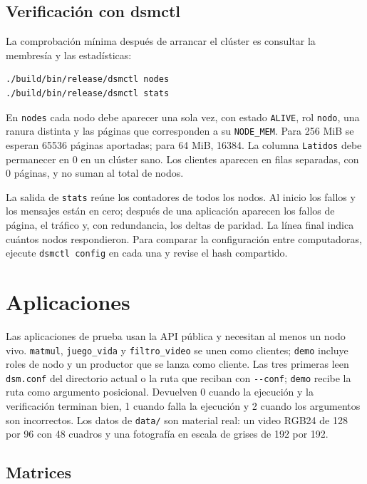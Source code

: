 \subsection{Verificación con dsmctl}\label{subsec:verificacion-dsmctl}

La comprobación mínima después de arrancar el clúster es consultar la membresía y las estadísticas:

\begin{lstlisting}
./build/bin/release/dsmctl nodes
./build/bin/release/dsmctl stats
\end{lstlisting}

En \texttt{nodes} cada nodo debe aparecer una sola vez, con estado \texttt{ALIVE}, rol \texttt{nodo}, una ranura distinta y las páginas que corresponden a su \texttt{NODE\_MEM}. Para 256 MiB se esperan 65536 páginas aportadas; para 64 MiB, 16384. La columna \texttt{Latidos} debe permanecer en 0 en un clúster sano. Los clientes aparecen en filas separadas, con 0 páginas, y no suman al total de nodos.

La salida de \texttt{stats} reúne los contadores de todos los nodos. Al inicio los fallos y los mensajes están en cero; después de una aplicación aparecen los fallos de página, el tráfico y, con redundancia, los deltas de paridad. La línea final indica cuántos nodos respondieron. Para comparar la configuración entre computadoras, ejecute \texttt{dsmctl config} en cada una y revise el hash compartido.

\section{Aplicaciones}\label{sec:aplicaciones}

Las aplicaciones de prueba usan la API pública y necesitan al menos un nodo vivo. \texttt{matmul}, \texttt{juego\_vida} y \texttt{filtro\_video} se unen como clientes; \texttt{demo} incluye roles de nodo y un productor que se lanza como cliente. Las tres primeras leen \texttt{dsm.conf} del directorio actual o la ruta que reciban con \texttt{-{}-conf}; \texttt{demo} recibe la ruta como argumento posicional. Devuelven 0 cuando la ejecución y la verificación terminan bien, 1 cuando falla la ejecución y 2 cuando los argumentos son incorrectos. Los datos de \texttt{data/} son material real: un video RGB24 de 128 por 96 con 48 cuadros y una fotografía en escala de grises de 192 por 192.

\subsection{Matrices}\label{subsec:matrices}

